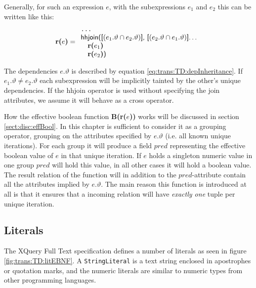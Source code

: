 Generally, for such an expression $e$, with the subexpressions $e_1$ and $e_2$ this can be written
like this:
\begin{equation*}
\mbox{\textbf{r(}}e\mbox{\textbf{)}}=
\begin{array}{l}
\mbox{\texttt{\ldots}} \\
\mbox{\textsf{hhjoin([}}(e_1.\vartheta\cap e_2.\vartheta)\mbox{\textsf{], [}}(e_2.\vartheta\cap e_1.\vartheta)
\mbox{\textsf{]\ldots}} \\ \quad
\mbox{\textbf{r(}}e_1\mbox{\textbf{)}} \\ \quad
\mbox{\textbf{r(}}e_2\mbox{\textbf{)}\textsf{)}}
\end{array}
\end{equation*}

The dependencies $e.\vartheta$ is described by equation \ref{eq:trans:TD:depInheritance}. If $e_{1}.\vartheta \neq
e_{2}.\vartheta$ each subexpression will be implicitly tainted by the other's unique dependencies. If the
\textsf{hhjoin} operator is used without specifying the join attributes, we assume it will behave as a
\textsf{cross} operator.

How the effective boolean function \textbf{B(r(}$e$\textbf{))} works will be discussed in section
\ref{sect:disc:effBool}. In this chapter is sufficient to consider it as a grouping operator, grouping on the
attributes specified by $e.\vartheta$ (i.e. all known unique iterations). For each group it will produce a field
$pred$ representing the effective boolean value of $e$ in that unique iteration. If $e$ holds a singleton numeric
value in one group $pred$ will hold this value, in all other cases it will hold a boolean value. The result
relation of the function will in addition to the $pred$-attribute contain all the attributes implied by
$e.\vartheta$. The main reason this function is introduced at all is that it ensures that a incoming relation
will have \emph{exactly one} tuple per unique iteration.

\subsection{Literals}
\label{sect:trans:TD:literal}

The XQuery Full Text specification\cite{w3c01} defines a number of literals as seen in figure
\ref{fig:trans:TD:litEBNF}. A \texttt{StringLiteral} is a text string enclosed in apostrophes or quotation marks,
and the numeric literals are similar to numeric types from other programming languages. 

